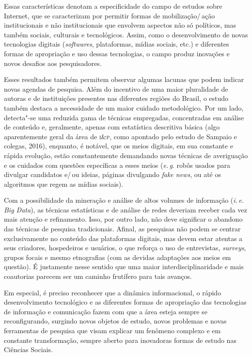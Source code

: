 Essas características denotam a especificidade do campo de estudos sobre
Internet, que se caracterizam por permitir formas de mobilização/\,ação
institucionais e não institucionais que envolvem aspectos não só
políticos, mas também sociais, culturais e tecnológicos. Assim, como o
desenvolvimento de novas tecnologias digitais (\textit{softwares},
plataformas, mídias sociais, etc.) e diferentes formas de apropriação e
uso dessas tecnologias, o campo produz inovações e novos desafios aos
pesquisadores.

Esses resultados também permitem observar algumas lacunas que podem
indicar novas agendas de pesquisa. Além do incentivo de uma maior
pluralidade de autoras e de instituições presentes nas diferentes
regiões do Brasil, o estudo também destaca a necessidade de um maior
cuidado metodológico. Por um lado, detecta"-se uma reduzida gama de
técnicas empregadas, concentradas em análise de conteúdo e, geralmente,
apenas com estatística descritiva básica (algo aparentemente geral da
área de \textsc{i\&p}, como apontado pelo estudo de Sampaio e colegas, 2016),
enquanto, é notável, que os meios digitais, em sua constante e rápida
evolução, estão constantemente demandando novas técnicas de averiguação
e os cuidados com questões específicas a esses meios (\textit{e.\,g}. robôs usados
para divulgar candidatos e/\,ou ideias, páginas divulgando \textit{fake
news}, ou até os algoritmos que regem as mídias sociais).

Com a possibilidade da mineração e análise de altos volumes de
informação (\textit{i.\,e.} \textit{Big Data}), as técnicas estatísticas e de análise de
redes deveriam receber cada vez mais atenção e refinamento. Isso, por
outro lado, não deve significar o abandono das técnicas de pesquisa
tradicionais. Afinal, as pesquisas não podem se centrar exclusivamente
no conteúdo das plataformas digitais, mas devem estar atentas a seus
criadores, hospedeiros e usuários, o que reforça o uso de entrevistas,
\textit{surveys}, grupos focais e mesmo etnografias (com as devidas
adaptações aos meios em questão). É justamente nesse sentido que uma
maior interdisciplinaridade e mais coautorias parecem ser um caminho
frutífero para tais avanços.

Em especial, é preciso reconhecer que a dinâmica informacional, o rápido
desenvolvimento tecnológico e as diferentes formas de apropriação das
tecnologias de informação e comunicação fazem com que a área esteja
sempre se reconfigurando, surgindo novos objetos de estudo, novos
problemas e novas ferramentas de pesquisa que visam explicar um fenômeno
complexo e em constante transformação, sempre aberto para inovadoras
formas de estudo nas Ciências Sociais.

